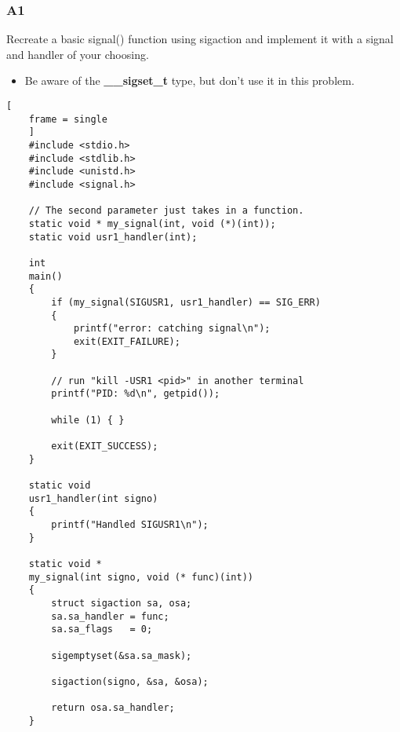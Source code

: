 \documentclass{article}
\begin{document}
\subsubsection{A1}
Recreate a basic signal() function using sigaction and implement it with a 
signal and handler of your choosing.
\begin{itemize}
    \item Be aware of the \textbf{\_\_sigset\_t} type, but don't use it in this problem.
\end{itemize}
\begin{lstlisting}[
    frame = single
    ]
    #include <stdio.h>
    #include <stdlib.h>
    #include <unistd.h>
    #include <signal.h>

    // The second parameter just takes in a function.
    static void * my_signal(int, void (*)(int));
    static void usr1_handler(int);

    int
    main()
    {
        if (my_signal(SIGUSR1, usr1_handler) == SIG_ERR)
        {
            printf("error: catching signal\n");
            exit(EXIT_FAILURE);
        }

        // run "kill -USR1 <pid>" in another terminal
        printf("PID: %d\n", getpid());

        while (1) { }

        exit(EXIT_SUCCESS);
    }

    static void
    usr1_handler(int signo)
    {
        printf("Handled SIGUSR1\n");
    }

    static void * 
    my_signal(int signo, void (* func)(int))
    {
        struct sigaction sa, osa;
        sa.sa_handler = func;
        sa.sa_flags   = 0;

        sigemptyset(&sa.sa_mask);

        sigaction(signo, &sa, &osa);

        return osa.sa_handler;
    }

\end{lstlisting}
\end{document}
